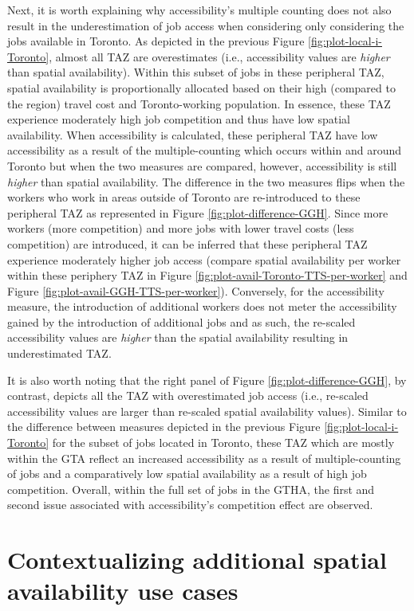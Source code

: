 \documentclass[]{elsarticle} %
\begin{document}
Next, it is worth explaining why accessibility's multiple counting does
not also result in the underestimation of job access when considering
only considering the jobs available in Toronto. As depicted in the
previous Figure \ref{fig:plot-local-i-Toronto}, almost all TAZ are
overestimates (i.e., accessibility values are \emph{higher} than spatial
availability). Within this subset of jobs in these peripheral TAZ,
spatial availability is proportionally allocated based on their high
(compared to the region) travel cost and Toronto-working population. In
essence, these TAZ experience moderately high job competition and thus
have low spatial availability. When accessibility is calculated, these
peripheral TAZ have low accessibility as a result of the
multiple-counting which occurs within and around Toronto but when the
two measures are compared, however, accessibility is still \emph{higher}
than spatial availability. The difference in the two measures flips when
the workers who work in areas outside of Toronto are re-introduced to
these peripheral TAZ as represented in Figure
\ref{fig:plot-difference-GGH}. Since more workers (more competition) and
more jobs with lower travel costs (less competition) are introduced, it
can be inferred that these peripheral TAZ experience moderately higher
job access (compare spatial availability per worker within these
periphery TAZ in Figure \ref{fig:plot-avail-Toronto-TTS-per-worker} and
Figure \ref{fig:plot-avail-GGH-TTS-per-worker}). Conversely, for the
accessibility measure, the introduction of additional workers does not
meter the accessibility gained by the introduction of additional jobs
and as such, the re-scaled accessibility values are \emph{higher} than
the spatial availability resulting in underestimated TAZ.

It is also worth noting that the right panel of Figure
\ref{fig:plot-difference-GGH}, by contrast, depicts all the TAZ with
overestimated job access (i.e., re-scaled accessibility values are
larger than re-scaled spatial availability values). Similar to the
difference between measures depicted in the previous Figure
\ref{fig:plot-local-i-Toronto} for the subset of jobs located in
Toronto, these TAZ which are mostly within the GTA reflect an increased
accessibility as a result of multiple-counting of jobs and a
comparatively low spatial availability as a result of high job
competition. Overall, within the full set of jobs in the GTHA, the first
and second issue associated with accessibility's competition effect are
observed.

\hypertarget{contextualizing-additional-spatial-availability-use-cases}{%
\section{Contextualizing additional spatial availability use
cases}\label{contextualizing-additional-spatial-availability-use-cases}}
\end{document}
